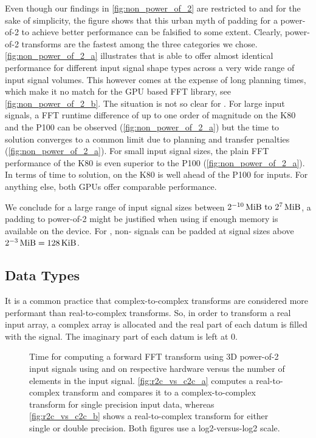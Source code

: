 Even though our findings in \cref{fig:non_power_of_2} are restricted to \fftw{} and \cufft{} for the sake of simplicity, the figure shows that this urban myth of padding for a power-of-2 to achieve better performance can be falsified to some extent. Clearly, power-of-2 transforms are the fastest among the three categories we chose. \cref{fig:non_power_of_2_a} illustrates that \fftw{} is able to offer almost identical performance for different input signal shape types across a very wide range of input signal volumes. This however comes at the expense of long planning times, which make it no match for the GPU based FFT library, see \cref{fig:non_power_of_2_b}. The situation is not so clear for \cufft{}. For large input signals, a FFT runtime difference of up to one order of magnitude on the K80 and the P100 can be observed (\cref{fig:non_power_of_2_a}) but the time to solution converges to a common limit due to planning and transfer penalties (\cref{fig:non_power_of_2_a}). For small input signal sizes, the plain FFT performance of the K80 is even superior to the P100 (\cref{fig:non_power_of_2_a}). In terms of time to solution, \cufft{} on the K80 is well ahead of the P100 for  inputs. For anything else, both GPUs offer comparable performance.

We conclude for a large range of input signal sizes between $\SIrange[exponent-base=2]{e-10}{e7}{\mebi\byte}$, a padding to power-of-2 might be justified when using \cufft{} if enough memory is available on the device. For \fftw{}, non- signals can be padded at signal sizes above $\SI[exponent-base=2]{e-3}{\mebi\byte} = \SI{128}{\kibi\byte}$.    

\subsection{Data Types}
\label{ssec:data_types}

It is a common practice that complex-to-complex transforms are considered more performant than real-to-complex transforms. So, in order to transform a real input array, a complex array is allocated and the real part of each datum is filled with the signal. The imaginary part of each datum is left at $0$.

\begin{figure}[!tbp]
  \centering
  \hfill
  \caption{Time for computing a forward FFT transform using 3D power-of-2 input signals using \fftw{} and \cufft{} on respective hardware versus the number of elements in the input signal. \cref{fig:r2c_vs_c2c_a} computes a real-to-complex transform and compares it to a complex-to-complex transform for single precision input data, whereas \cref{fig:r2c_vs_c2c_b} shows a real-to-complex transform for either single or double precision. Both figures use a log2-versus-log2 scale.}
  \label{fig:r2c_vs_c2c}
\end{figure}

